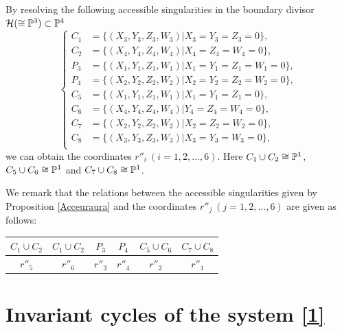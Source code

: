 \begin{prop}\label{Acceuraura}
By resolving the following accessible singularities in the boundary divisor ${\mathcal H} (\cong {\Bbb P}^3) \subset {\Bbb P}^4$
\begin{equation}
  \left\{
  \begin{aligned}
   C_1 &=\{(X_3,Y_3,Z_3,W_3)|X_3=Y_3=Z_3=0\},\\
   C_2 &=\{(X_4,Y_4,Z_4,W_4)|X_4=Z_4=W_4=0\},\\
   P_3 &=\{(X_1,Y_1,Z_1,W_1)|X_1=Y_1=Z_1=W_1=0 \},\\
   P_4 &=\{(X_2,Y_2,Z_2,W_2)|X_2=Y_2=Z_2=W_2=0\},\\
   C_5 &=\{(X_1,Y_1,Z_1,W_1)|X_1=Y_1=Z_1=0\},\\
   C_6 &=\{(X_4,Y_4,Z_4,W_4)|Y_4=Z_4=W_4=0\},\\
   C_7 &=\{(X_2,Y_2,Z_2,W_2)|X_2=Z_2=W_2=0 \},\\
   C_8 &=\{(X_3,Y_3,Z_3,W_3)|X_3=Y_3=W_3=0 \},\\
   \end{aligned}
  \right. 
\end{equation}
we can obtain the coordinates $r''_i \ (i=1,2,\dots,6)$. Here $C_1 \cup C_2 \cong {\Bbb P}^1$, $C_5 \cup C_6 \cong {\Bbb P}^1$ and $C_7 \cup C_8 \cong {\Bbb P}^1$.
\end{prop}
We remark that the relations between the accessible singularities given by Proposition \ref{Acceuraura} and the coordinates $r''_j \ (j=1,2,\dots,6)$ are given as follows:
\begin{center}
\begin{tabular}{|c|c|c|c|c|c|} \hline 
$C_1 \cup C_2$ &$C_1 \cup C_2$  & $P_3$ & $P_4$ & $C_5 \cup C_6$& $C_7 \cup C_8$  \\ \hline 
$r''_5$ & $r''_6$ & $r''_3$ & $r''_4$ & $r''_2$ & $r''_1$  \\ \hline 
\end{tabular}
\end{center}



\section{Invariant cycles of the system \eqref{1}}

